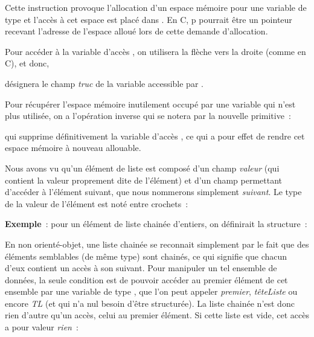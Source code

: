 	Cette instruction provoque l'allocation d'un espace mémoire pour
	une variable de type  et l'accès à 
	cet espace est placé dans . 
	En C, p pourrait être un pointeur recevant
	l'adresse de l'espace alloué lors de cette demande d'allocation.

	Pour accéder à la variable d'accès , 
	on utilisera la flèche vers la droite (comme en C), et donc,
	
	désignera le champ \textit{truc} de la variable accessible par .

	
	Pour récupérer l'espace mémoire inutilement occupé par une variable 
	qui n'est plus utilisée, on a l'opération inverse
	qui se notera par la nouvelle primitive~:

	
	qui supprime définitivement la variable d'accès , 
	ce qui a pour effet de rendre cet espace mémoire à nouveau
	allouable.

	Nous avons vu qu'un élément de liste est composé d'un champ \textit{valeur} 
	(qui contient la valeur proprement dite de
	l'élément) et d'un champ permettant d'accéder à l'élément suivant, 
	que nous nommerons simplement \textit{suivant}. Le
	type  de la valeur de l'élément est noté entre crochets~:
	
	
	\textbf{Exemple}~: pour un élément de liste chainée d'entiers, on définirait la structure~:
	
	
	En non orienté-objet, une liste chainée se reconnait simplement 
	par le fait que des éléments semblables (de même type)
	sont chainés, ce qui signifie que chacun d'eux contient un accès 
	à son suivant. Pour manipuler un tel ensemble de
	données, la seule condition est de pouvoir accéder au premier 
	élément de cet ensemble par une variable de type ,
	que l'on peut appeler \textit{premier}, \textit{têteListe} ou encore 
	\textit{TL} (et qui n'a nul besoin d'être
	structurée). La liste chainée n'est donc rien d'autre qu'un accès, 
	celui au premier élément. Si cette liste est vide,
	cet accès a pour valeur \textit{rien}~:

